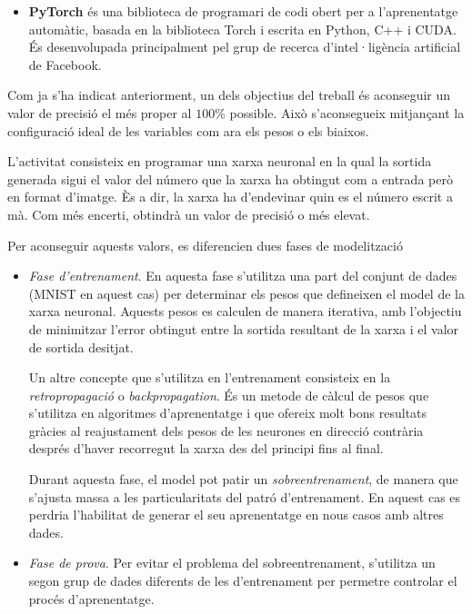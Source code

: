 \begin{refsection}
\begin{itemize}
		\item \textbf{PyTorch} és una biblioteca de programari de codi obert per a l'aprenentatge automàtic, basada en la biblioteca Torch i escrita en Python, C++ i CUDA. És desenvolupada principalment pel grup de recerca d'intel·ligència artificial de Facebook.\supercite{PyTorch}
		
		
	\end{itemize}

	Com ja s'ha indicat anteriorment, un dels objectius del treball és aconseguir un valor de precisió el més proper al $100\%$ possible. Això s'aconsegueix mitjançant la configuració ideal de les variables com ara els pesos o els biaixos.
	
	L'activitat consisteix en programar una xarxa neuronal en la qual la sortida generada sigui el valor del número que la xarxa ha obtingut com a entrada però en format d’imatge. Ès a dir, la xarxa ha d'endevinar quin es el número escrit a mà. Com més encerti, obtindrà un valor de precisió o més
	elevat.
	
	Per aconseguir aquests valors, es diferencien dues fases de modelització
	
	\begin{itemize}
		\item \textit{Fase d’entrenament}. En aquesta fase s’utilitza una part
		del conjunt de dades (MNIST en aquest cas) per determinar els pesos que defineixen el model de la xarxa neuronal. Aquests pesos es calculen de manera iterativa, amb l'objectiu de minimitzar l'error obtingut entre la sortida resultant de la xarxa i el valor de sortida desitjat.
		
		Un altre concepte que s'utilitza en l'entrenament consisteix en la \textit{retropropagació} o \textit{backpropagation}.\supercite{backprop} És un metode de càlcul de pesos que s'utilitza en algoritmes d'aprenentatge i que ofereix molt bons resultats gràcies al reajustament dels pesos de les neurones en direcció contrària després d’haver recorregut la xarxa des del principi fins al final.
		
		Durant aquesta fase, el model pot patir un \textit{sobreentrenament}, de manera que s’ajusta massa a les particularitats del patró d'entrenament. En aquest cas es perdria l'habilitat de generar el seu aprenentatge en nous casos amb altres dades.
		
		\item \textit{Fase de prova}. Per evitar el problema del sobreentrenament, s'utilitza un segon
		grup de dades diferents de les d'entrenament per permetre controlar el procés d'aprenentatge.
		

\end{itemize}
\end{refsection}
